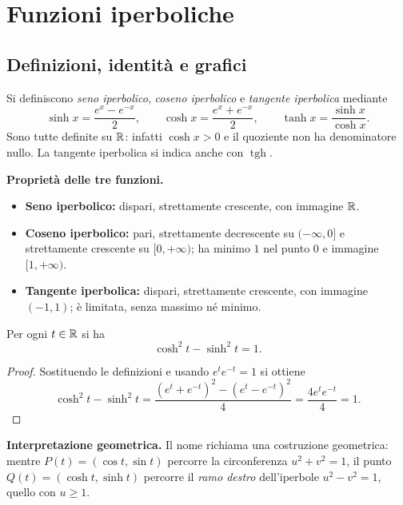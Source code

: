 \section{Funzioni iperboliche}
\label{sec:iperboliche}

\subsection{Definizioni, identità e grafici}

Si definiscono \emph{seno iperbolico}, \emph{coseno iperbolico} e \emph{tangente iperbolica} mediante
\[
\sinh x=\frac{e^x-e^{-x}}2,\qquad
\cosh x=\frac{e^x+e^{-x}}2,\qquad
\tanh x=\frac{\sinh x}{\cosh x}.
\]
Sono tutte definite su $\mathbb{R}$: infatti $\cosh x>0$ e il quoziente non ha denominatore nullo. La tangente iperbolica si indica anche con $\operatorname{tgh}$.

\textbf{Proprietà delle tre funzioni.}
\begin{itemize}
  \item \textbf{Seno iperbolico:} dispari, strettamente crescente, con immagine $\mathbb{R}$.
  \item \textbf{Coseno iperbolico:} pari, strettamente decrescente su $(-\infty,0]$ e strettamente crescente su $[0,+\infty)$; ha minimo $1$ nel punto $0$ e immagine $[1,+\infty)$.
  \item \textbf{Tangente iperbolica:} dispari, strettamente crescente, con immagine $(-1,1)$; è limitata, senza massimo né minimo.
\end{itemize}

\begin{proposizione}
Per ogni $t\in\mathbb{R}$ si ha
\[
\boxed{\cosh^2t-\sinh^2t=1}.
\]
\end{proposizione}
\begin{proof}
Sostituendo le definizioni e usando $e^te^{-t}=1$ si ottiene
\[
\cosh^2t-\sinh^2t
=\frac{(e^t+e^{-t})^2-(e^t-e^{-t})^2}{4}
=\frac{4e^te^{-t}}4=1.
\]
\end{proof}

\textbf{Interpretazione geometrica.} Il nome richiama una costruzione geometrica: mentre $P(t)=(\cos t,\sin t)$ percorre la circonferenza $u^2+v^2=1$, il punto $Q(t)=(\cosh t,\sinh t)$ percorre il \emph{ramo destro} dell'iperbole $u^2-v^2=1$, quello con $u\ge1$.

